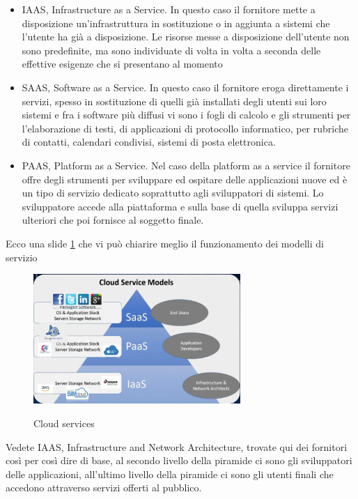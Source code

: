 \begin{itemize}
    \item IAAS, Infrastructure as a Service. In questo caso il fornitore mette a disposizione un'infrastruttura in sostituzione o in aggiunta a sistemi che l'utente ha già a disposizione. Le risorse messe a disposizione dell'utente non sono predefinite, ma sono individuate di volta in volta a seconda delle effettive esigenze che si presentano al momento
    \item SAAS, Software as a Service. In questo caso il fornitore eroga direttamente i servizi, spesso in sostituzione di quelli già installati degli utenti sui loro sistemi e fra i software più diffusi vi sono i fogli di calcolo e gli strumenti per l'elaborazione di testi, di applicazioni di protocollo informatico, per rubriche di contatti, calendari condivisi, sistemi di posta elettronica.
    \item PAAS, Platform as a Service. Nel caso della platform as a service il fornitore offre degli strumenti per sviluppare ed ospitare delle applicazioni nuove ed è un tipo di servizio dedicato soprattutto agli sviluppatori di sistemi. Lo sviluppatore accede alla piattaforma e sulla base di quella sviluppa servizi ulteriori che poi fornisce al soggetto finale. 
\end{itemize}   

Ecco una slide \ref{fig:Cloud_services} che vi può chiarire meglio il funzionamento dei modelli di servizio   

\begin{figure}[ht!]
    \centering
    \includegraphics[width=0.7\textwidth]{images/17_lez_fig_02}
    \label{fig:Cloud_services}
    \caption{Cloud services}
\end{figure}

Vedete IAAS, Infrastructure and Network Architecture, trovate qui dei fornitori così per così dire di base, al secondo livello della piramide ci sono gli sviluppatori delle applicazioni, all'ultimo livello della piramide ci sono gli utenti finali che accedono attraverso servizi offerti al pubblico. 

